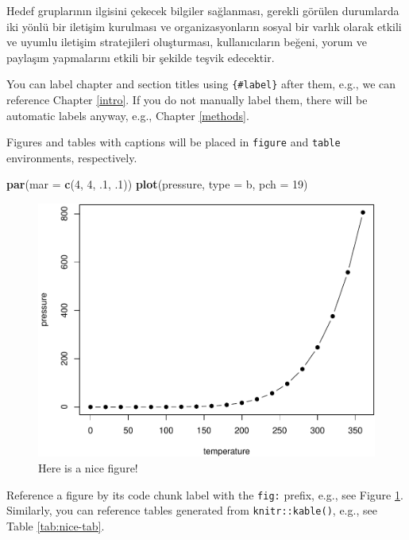 \documentclass[
]{book}
\newenvironment{Shaded}{\begin{snugshade}}{\end{snugshade}}
\newcommand{\AttributeTok}[1]{\textcolor[rgb]{0.13,0.29,0.53}{#1}}
\newcommand{\DecValTok}[1]{\textcolor[rgb]{0.00,0.00,0.81}{#1}}
\newcommand{\FunctionTok}[1]{\textcolor[rgb]{0.13,0.29,0.53}{\textbf{#1}}}
\newcommand{\NormalTok}[1]{#1}
\newcommand{\StringTok}[1]{\textcolor[rgb]{0.31,0.60,0.02}{#1}}
\begin{document}
Hedef gruplarının ilgisini çekecek bilgiler sağlanması, gerekli görülen durumlarda iki yönlü bir iletişim kurulması ve organizasyonların sosyal bir varlık olarak etkili ve uyumlu iletişim stratejileri oluşturması, kullanıcıların beğeni, yorum ve paylaşım yapmalarını etkili bir şekilde teşvik edecektir.

You can label chapter and section titles using \texttt{\{\#label\}} after them, e.g., we can reference Chapter \ref{intro}. If you do not manually label them, there will be automatic labels anyway, e.g., Chapter \ref{methods}.

Figures and tables with captions will be placed in \texttt{figure} and \texttt{table} environments, respectively.

\begin{Shaded}
\begin{Highlighting}[]
\FunctionTok{par}\NormalTok{(}\AttributeTok{mar =} \FunctionTok{c}\NormalTok{(}\DecValTok{4}\NormalTok{, }\DecValTok{4}\NormalTok{, .}\DecValTok{1}\NormalTok{, .}\DecValTok{1}\NormalTok{))}
\FunctionTok{plot}\NormalTok{(pressure, }\AttributeTok{type =} \StringTok{\textquotesingle{}b\textquotesingle{}}\NormalTok{, }\AttributeTok{pch =} \DecValTok{19}\NormalTok{)}
\end{Highlighting}
\end{Shaded}

\begin{figure}

{\centering \includegraphics[width=0.8\linewidth]{01-BOLUM_files/figure-latex/nice-fig-1} 

}

\caption{Here is a nice figure!}\label{fig:nice-fig}
\end{figure}

Reference a figure by its code chunk label with the \texttt{fig:} prefix, e.g., see Figure \ref{fig:nice-fig}. Similarly, you can reference tables generated from \texttt{knitr::kable()}, e.g., see Table \ref{tab:nice-tab}.
\end{document}
